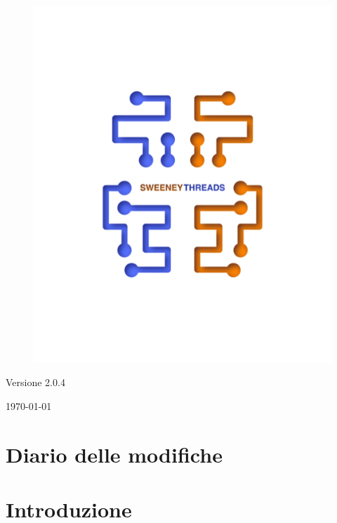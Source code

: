 \documentclass[a4paper]{article}
\begin{document}
\begin{titlepage}
		\begin{figure}[H]
			\centering
			\includegraphics[scale=0.8]{sweeney.png}
		\end{figure}
		\begin{center}
			Versione 2.0.4
		\end{center}
		{\large \today}\\[3cm]
		\vfill
	\end{titlepage}


	\tableofcontents

	\newpage
	\section*{Diario delle modifiche}

	\newpage
	\section{Introduzione}
\end{document}

